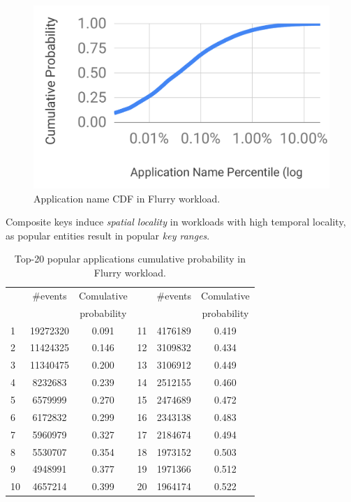 \begin{figure}
\centering
\includegraphics[width=0.5\columnwidth]{figs/cdf.pdf}
\caption{
{Application name CDF in Flurry workload.}
}
\label{fig:cdf}
\end{figure}
Composite keys induce \emph{spatial locality} in workloads with high {temporal locality}, as 
popular entities 
result in popular \emph{key ranges}. 


\begin{table}[tb]
{\small{
\begin{tabular}{|l|c|c||l|c|c|}
\hline 
  & \#events & Comulative &  & \#events & Comulative  \\
  &  &  probability& &  &  probability \\
\hline 
1 & 19272320 & 0.091 &11 & 4176189 & 0.419\\
2 & 11424325 & 0.146&12 & 3109832 & 0.434\\
3 & 11340475  & 0.200&13 & 3106912 & 0.449\\
4& 8232683 &0.239 &14 & 2512155 & 0.460\\
5& 6579999 &0.270 &15& 2474689 & 0.472\\
6& 6172832 & 0.299&16 & 2343138 & 0.483\\
7& 5960979 & 0.327&17 & 2184674 &0.494 \\
8 & 5530707& 0.354&18 & 1973152& 0.503\\
9& 4948991 & 0.377&19 & 1971366& 0.512\\
10 & 4657214 & 0.399&20 & 1964174& 0.522\\
\hline 
\end{tabular}
}}
\caption{{Top-20 popular applications cumulative probability in Flurry workload.}}
\label{table:popular}
\end{table}



